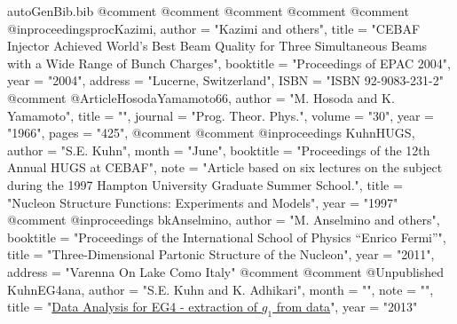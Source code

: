 \begin{filecontents*}{autoGenBib.bib}
@comment %
@comment %
@comment %
@comment %
@comment %
@inproceedings{procKazimi,
    author    = "Kazimi and others",
    title     = "{CEBAF Injector Achieved World's Best Beam Quality for Three Simultaneous Beams with a Wide Range of Bunch Charges}",
	booktitle = "Proceedings of EPAC 2004", 
	year      = "2004",
	address   = "Lucerne, Switzerland",
	ISBN      = "ISBN 92-9083-231-2"
}
@comment %
@Article{HosodaYamamoto66,
     author    = "M. Hosoda and K. Yamamoto",
     title     = "",
     journal   = "Prog. Theor. Phys.",
     volume    = "30",
     year      = "1966",
     pages     = "425",
}
@comment %
@comment %
@inproceedings{ KuhnHUGS,
	author = "S.E. Kuhn",
	month = "June",
	booktitle = "Proceedings of the 12th Annual HUGS at CEBAF", 
	note = "Article based on six lectures on the subject during the 1997 Hampton University Graduate Summer School.",
	title = "{Nucleon Structure Functions: Experiments and Models}",
	year = "1997"
}
@comment %
@inproceedings{ bkAnselmino,
	author = "M. Anselmino and others",
	booktitle = "Proceedings of the International School of Physics ``Enrico Fermi''", 
	title = "{Three-Dimensional Partonic Structure of the Nucleon}",
	year = "2011",
	address = "Varenna On Lake Como Italy"
}
@comment %
@comment %
@Unpublished{ KuhnEG4ana,
	author = "S.E. Kuhn and K. Adhikari",
	month = "",
	note = "",
	title = "{\href{https://userweb.jlab.org/\~kuhn/EG4/EG4\_analysis.pdf}{Data Analysis for EG4 - extraction of $g_1$ from data}}",
	year = "2013"
}


\end{filecontents*}
